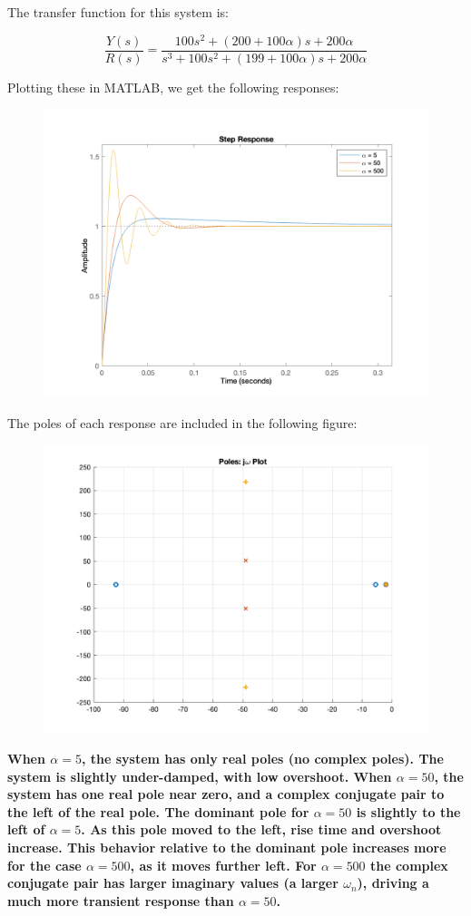 \documentclass[12pt, letterpaper]{../assignment}
\begin{document}
The transfer function for this system is:

$$ \frac{Y(s)}{R(s)} = \frac{100 s^2 + (200 + 100\alpha) s +200\alpha}{s^3 + 100 s^2 + (199 + 100 \alpha) s + 200 \alpha} $$

Plotting these in MATLAB, we get the following responses:

\begin{figure}[H]
    \centering
    \includegraphics[width=0.8\linewidth]{./figures/Problem_2.png}
    \label{fig:step}
\end{figure}

The poles of each response are included in the following figure:

\begin{figure}[H]
    \centering
    \includegraphics[width=0.7\linewidth]{./figures/Problem_2_roots.png}
    \label{fig:step}
\end{figure}

\begin{answer}
\bf{
When $\alpha  = 5$, the system has only real poles (no complex poles). The system is slightly under-damped, with low overshoot.
When $\alpha  = 50$, the system has one real pole near zero, and a complex conjugate pair to the left of the real pole.
The dominant pole for $\alpha = 50$ is slightly to the left of $\alpha = 5$.
As this pole moved to the left, rise time and overshoot increase.
This behavior relative to the dominant pole increases more for the case $\alpha = 500$, as it moves further left.
For $\alpha = 500$ the complex conjugate pair has larger imaginary values (a larger $\omega_n$),
driving a much more transient response than $\alpha = 50$.
}
\end{answer}
\end{document}
